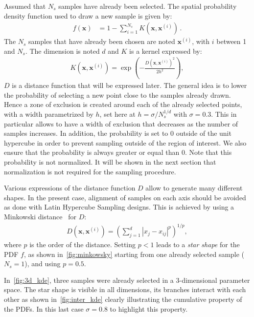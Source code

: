 Assumed that $N_s$ samples have already been selected. The spatial probability density function used to draw a new sample is given by:
\begin{align}
f(\mathbf{x}) &= 1 - \sum_{i=1}^{N_{s}} K\left(\mathbf{x},\mathbf{x}^{(i)}\right) \, .
\end{align}
The $N_s$ samples that have already been chosen are noted $\mathbf{x}^{(i)}$, with $i$ between 1 and $N_s$. The dimension is noted $d$ and $K$ is a kernel expressed by:
\begin{align}
K\left(\mathbf{x},\mathbf{x}^{(i)}\right) = \exp\left( - \frac{D\left(\mathbf{x},\mathbf{x}^{(i)}\right)^2}{2h^2} \right),
\end{align}
$D$ is a distance function that will be expressed later. The general idea is to lower the probability of selecting a new point close to the samples already drawn. Hence a zone of exclusion is created around each of the already selected points, with a width parametrized by $h$, set here at $h = \sigma / N_s^{1/d}$ with $\sigma=0.3$. This in particular allows to have a width of exclusion that decreases as the number of samples increases. In addition, the probability is set to 0 outside of the unit hypercube in order to prevent sampling outside of the region of interest. We also ensure that the probability is always greater or equal than 0. Note that this probability is not normalized. It will be shown in the next section that normalization is not required for the sampling procedure.

Various expressions of the distance function $D$ allow to generate many different shapes. In the present case, alignment of samples on each axis should be avoided as done with Latin Hypercube Sampling designs. This is achieved by using a Minkowski distance~\citep{Cha2007} for $D$:
\begin{align}
D\left(\mathbf{x},\mathbf{x}^{(i)}\right)=\left(\sum_{j=1}^d |x_{j}-x_{ij}|^p\right)^{1/p},
\end{align}
\noindent where $p$ is the order of the distance. Setting $p < 1$ leads to a \emph{star shape} for the PDF $f$, as shown in~\cref{fig:minkowsky} starting from one already selected sample ($N_s = 1$), and using $p=0.5$.

In~\cref{fig:3d_kde}, three samples were already selected in a 3-dimensional parameter space. The star shape is visible in all dimensions, its branches interact with each other as shown in~\cref{fig:inter_kde} clearly illustrating the cumulative property of the PDFs. In this last case $\sigma=0.8$ to highlight this property.

